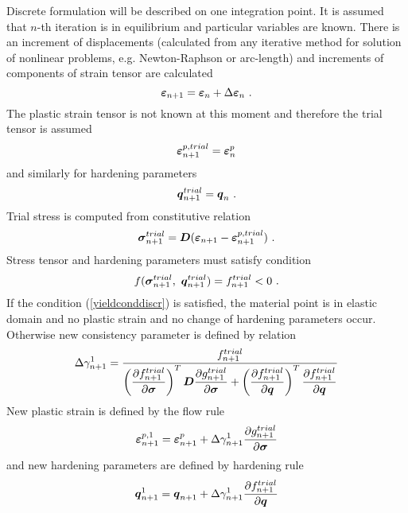 Discrete formulation will be described on one integration point. It is assumed that $n$-th iteration is
in equilibrium and particular variables are known. There is an increment of displacements (calculated
from any iterative method for solution of nonlinear problems, e.g. Newton-Raphson or arc-length) and
increments of components of strain tensor are calculated
\begin{equation}
\mbox{\boldmath$\varepsilon$}_{n+1} = \mbox{\boldmath$\varepsilon$}_{n} + \Delta \mbox{\boldmath$\varepsilon$}_{n}\ .
\end{equation}
The plastic strain tensor is not known at this moment and therefore the trial tensor  is assumed
\begin{equation}
\mbox{\boldmath$\varepsilon$}_{n+1}^{p, trial} = \mbox{\boldmath$\varepsilon$}_{n}^{p}
\end{equation}
and similarly for hardening parameters
\begin{equation}
\mbox{\boldmath$q$}_{n+1}^{trial} = \mbox{\boldmath$q$}_{n}\ .
\end{equation}
Trial stress is computed from constitutive relation
\begin{equation}
\mbf{\sigma}_{n+1}^{trial} = \mbf{D} (\mbf{\varepsilon}_{n+1} - \mbf{\varepsilon}_{n+1}^{p, trial})\ .
\end{equation}
Stress tensor and hardening parameters must satisfy condition
\begin{equation}\label{yieldconddiscr}
f(\mbox{\boldmath$\sigma$}_{n+1}^{trial},\ \mbox{\boldmath$q$}_{n+1}^{trial}) = f_{n+1}^{trial} < 0\ .
\end{equation}
If the condition (\ref{yieldconddiscr}) is satisfied, the material point is in elastic domain and
no plastic strain and no change of hardening parameters occur. Otherwise new consistency parameter
is defined by relation
\begin{equation}\label{discrgamma}
\Delta \gamma_{n+1}^{1} = \mbox{$\displaystyle\frac{f_{n+1}^{trial}}{\left(\mbox{$\displaystyle\frac{\partial{f_{n+1}^{trial}}}{\partial{\mbox{\boldmath$\sigma$}}}$}\right)^T \mbox{\boldmath$D$} \mbox{$\displaystyle\frac{\partial{g_{n+1}^{trial}}}{\partial{\mbox{\boldmath$\sigma$}}}$} +
\left(\mbox{$\displaystyle\frac{\partial{f_{n+1}^{trial}}}{\partial{\mbox{\boldmath$q$}}}$}\right)^T \mbox{$\displaystyle\frac{\partial{f_{n+1}^{trial}}}{\partial{\mbox{\boldmath$q$}}}$}}$}
\end{equation}
New plastic strain is defined by the flow rule
\begin{equation}
\mbox{\boldmath$\varepsilon$}^{p,1}_{n+1} = \mbox{\boldmath$\varepsilon$}^{p}_{n+1} + \Delta \gamma_{n+1}^{1} \mbox{$\displaystyle\frac{\partial{g_{n+1}^{trial}}}{\partial{\mbox{\boldmath$\sigma$}}}$}
\end{equation}
and new hardening parameters are defined by hardening rule
\begin{equation}
\mbox{\boldmath$q$}_{n+1}^{1} = \mbox{\boldmath$q$}_{n+1} + \Delta \gamma_{n+1}^{1} \mbox{$\displaystyle\frac{\partial{f_{n+1}^{trial}}}{\partial{\mbox{\boldmath$q$}}}$}
\end{equation}

